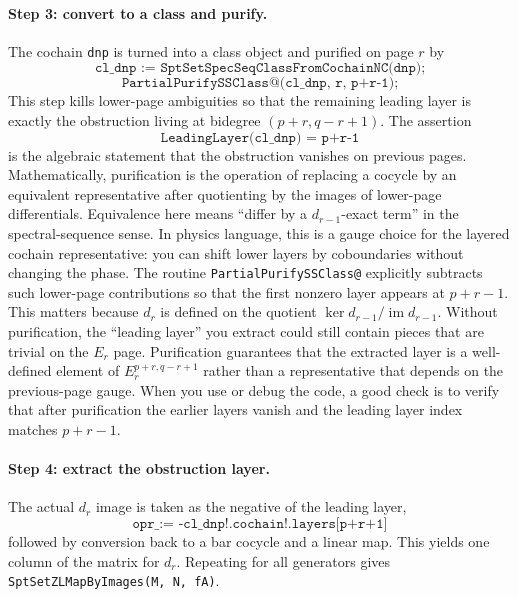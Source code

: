 \documentclass{SciPost}
\begin{document}
\paragraph{Step 3: convert to a class and purify.}
The cochain \texttt{dnp} is turned into a class object and purified on page $r$ by
\begin{equation}
\texttt{cl\_dnp := SptSetSpecSeqClassFromCochainNC(dnp);}
\end{equation}
\begin{equation}
\texttt{PartialPurifySSClass@(cl\_dnp, r, p+r-1);}
\end{equation}
This step kills lower-page ambiguities so that the remaining leading layer is exactly the obstruction living at bidegree $(p+r, q-r+1)$.
The assertion
\begin{equation}
\texttt{LeadingLayer(cl\_dnp) = p+r-1}
\end{equation}
is the algebraic statement that the obstruction vanishes on previous pages.
Mathematically, purification is the operation of replacing a cocycle by an equivalent representative after quotienting by the images of lower-page differentials.
Equivalence here means ``differ by a $d_{r-1}$-exact term'' in the spectral-sequence sense.
In physics language, this is a gauge choice for the layered cochain representative: you can shift lower layers by coboundaries without changing the phase.
The routine \texttt{PartialPurifySSClass@} explicitly subtracts such lower-page contributions so that the first nonzero layer appears at $p+r-1$.
This matters because $d_r$ is defined on the quotient $\ker d_{r-1}/\operatorname{im} d_{r-1}$.
Without purification, the ``leading layer'' you extract could still contain pieces that are trivial on the $E_r$ page.
Purification guarantees that the extracted layer is a well-defined element of $E_r^{p+r,q-r+1}$ rather than a representative that depends on the previous-page gauge.
When you use or debug the code, a good check is to verify that after purification the earlier layers vanish and the leading layer index matches $p+r-1$.

\paragraph{Step 4: extract the obstruction layer.}
The actual $d_r$ image is taken as the negative of the leading layer,
\begin{equation}
\texttt{opr\_ := -cl\_dnp!.cochain!.layers[p+r+1]}
\end{equation}
followed by conversion back to a bar cocycle and a linear map.
This yields one column of the matrix for $d_r$.
Repeating for all generators gives \texttt{SptSetZLMapByImages(M, N, fA)}.
\end{document}
